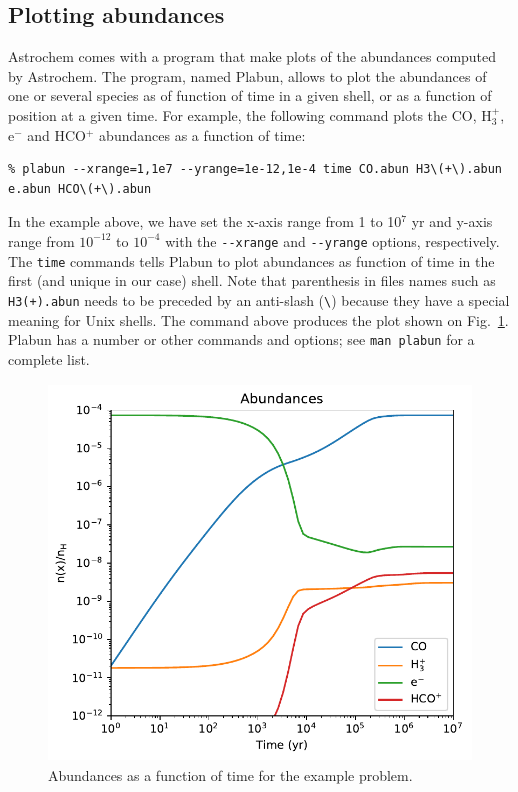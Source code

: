 \documentclass[a4paper,12pt]{article}
\begin{document}
\subsection{Plotting abundances}
\label{sec:plotting-abundances}

Astrochem comes with a program that make plots of the abundances
computed by Astrochem. The program, named Plabun, allows to plot the
abundances of one or several species as of function of time in a given
shell, or as a function of position at a given time. For example, the
following command plots the CO, H$_{3}^{+}$, e$^{-}$ and HCO$^{+}$
abundances as a function of time:

\begin{verbatim}
% plabun --xrange=1,1e7 --yrange=1e-12,1e-4 time CO.abun H3\(+\).abun
e.abun HCO\(+\).abun
\end{verbatim}

In the example above, we have set the x-axis range from 1 to 10$^{7}$
yr and y-axis range from $10^{-12}$ to $10^{-4}$ with the
\verb=--xrange= and \verb=--yrange= options, respectively. The
\verb=time= commands tells Plabun to plot abundances as function of
time in the first (and unique in our case) shell. Note that
parenthesis in files names such as \verb=H3(+).abun= needs to be
preceded by an anti-slash (\verb=\=) because they have a special
meaning for Unix shells. The command above produces the plot shown on
Fig.~\ref{fig:example-abundances}. Plabun has a number or other
commands and options; see \verb=man plabun= for a complete list.

\begin{figure}
  \begin{center}
    \includegraphics[height=10cm]{fig1.pdf}
  \end{center}
  \caption{Abundances as a function of time for the example problem.}
  \label{fig:example-abundances}
\end{figure}
\end{document}
